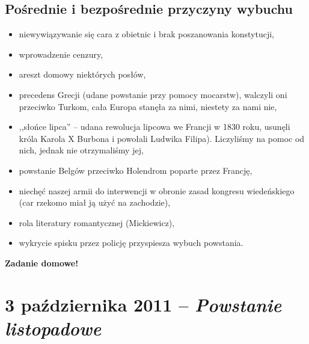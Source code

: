 \documentclass [a4paper, 11pt, oneside]{book}
\begin{document}
    \section{Pośrednie i bezpośrednie przyczyny wybuchu} %
    \label{sec:po_rednie_i_bezpo_rednie_przyczyny_wybuchu}
        \begin{itemize}
            \item niewywiązywanie się cara z obietnic i brak poszanowania konstytucji,
            \item wprowadzenie cenzury,
            \item areszt domowy niektórych posłów,
            \item precedens Grecji (udane powstanie przy pomocy mocarstw), walczyli oni przeciwko Turkom, cała Europa stanęła za nimi, niestety za nami nie,
            \item ,,słońce lipca'' -- udana rewolucja lipcowa we Francji w 1830 roku, usunęli króla Karola X Burbona i powołali Ludwika Filipa). Liczyliśmy na pomoc od nich, jednak nie otrzymaliśmy jej,
            \item powstanie Belgów przeciwko Holendrom poparte przez Francję,
            \item niechęć naszej armii do interwencji w obronie zasad kongresu wiedeńskiego (car rzekomo miał ją użyć na zachodzie),
            \item rola literatury romantycznej (Mickiewicz),
            \item wykrycie spisku przez policję przyspiesza wybuch powstania.
        \end{itemize}
    \begin{center}
        \bf Zadanie domowe!
    \end{center}
\chapter{3 października 2011 -- \textit{Powstanie listopadowe}} %
\label{cha:3_pa_dziernika_2011_textit}
\end{document}
